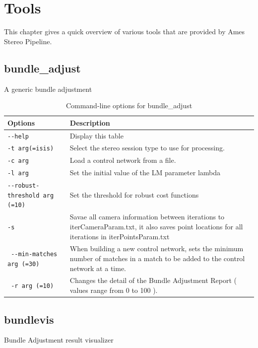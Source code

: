 \chapter{Tools}

This chapter gives a quick overview of various tools that are provided by
Ames Stereo Pipeline.

\section{bundle\_adjust}
\label{bundle_adjust}

A generic bundle adjustment

\begin{longtable}{|l|p{10cm}|}
\caption{Command-line options for bundle\_adjust}
\label{tbl:bundle_adjust}
\endfirsthead
\endhead
\endfoot
\endlastfoot
\hline
Options & Description \\ \hline \hline
\verb#--help# & Display this table \\ \hline
\verb#-t arg(=isis)# & Select the stereo session type to use for processing. \\ \hline
\verb#-c arg# & Load a control network from a file. \\ \hline
\verb#-l arg# & Set the initial value of the LM parameter lambda \\ \hline
\verb#--robust-threshold arg (=10)# & Set the threshold for robust cost functions \\ \hline
\verb#-s# & Savae all camera information between iterations to iterCameraParam.txt, it also saves point locations for all iterations in iterPointsParam.txt \\ \hline
\verb# --min-matches arg (=30)# & When building a new control network, sets the minimum number of matches in a match to be added to the control network at a time. \\ \hline
\verb# -r arg (=10)# & Changes the detail of the Bundle Adjustment Report ( values range from 0 to 100 ). \\ \hline
\end{longtable}

\section{bundlevis}
\label{bundlevis}

Bundle Adjustment result visualizer

